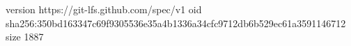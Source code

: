 version https://git-lfs.github.com/spec/v1
oid sha256:350bd163347c69f9305536e35a4b1336a34cfc9712db6b529ec61a3591146712
size 1887
